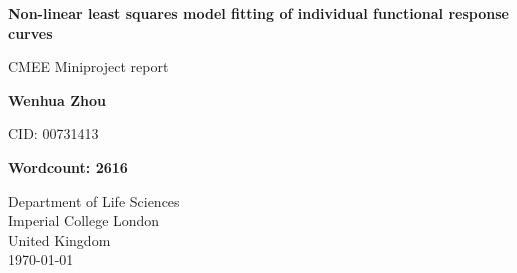 \documentclass{article}[11pt,a4,twosided,doublespacing,titlepagenumber=on,numbers=endperiod]
\begin{document}
\begin{titlepage}
   \begin{center}
       \vspace*{1cm}
 
       {\huge \textbf{Non-linear least squares model fitting of individual functional response curves}}
       
       \vspace{1.5cm}
       
       {\Large CMEE Miniproject report}
       
       \vspace{3.5cm}
 
       {\LARGE \textbf{Wenhua Zhou}}
       
       \vspace{1.5cm}
       
       {\Large CID: 00731413}
       
       \vspace{1.5cm}
       
       {\Large {}}
       
       
       
       
       
       \vfill
       
       \textbf{Wordcount: 2616}
 
       \vspace{0.8cm}
 
 
       Department of Life Sciences\\
       Imperial College London\\
       United Kingdom\\
       \today
 
   \end{center}
\end{titlepage}

\linenumbers
\end{document}
